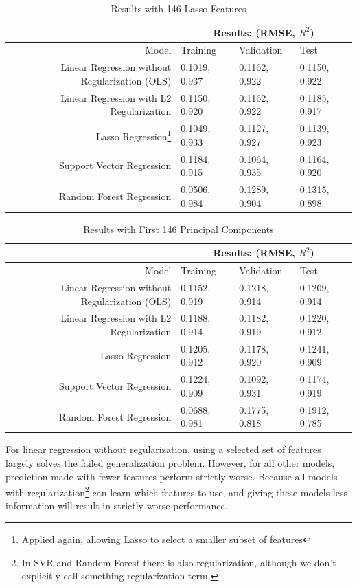\documentclass[a4paper]{article}
\begin{document}
\begin{table}[H]
\centering
\caption{\large Results with 146 Lasso Features}
\vspace{0.3cm}
\begin{tabular}{| r | p{2cm} | p{2cm} | p{2cm} |}
\hline
 & \multicolumn{3}{|c|}{Results: (RMSE, $R^2$)} \\
\hline
Model & Training & Validation & Test \\
\hline
Linear Regression without Regularization (OLS) & 0.1019, 0.937 & 0.1162, 0.922 & 0.1150, 0.922 \\
\hline
Linear Regression with L2 Regularization & 0.1150, 0.920 & 0.1162, 0.922 & 0.1185, 0.917 \\
\hline
Lasso Regression\footnote{Applied again, allowing Lasso to select a smaller subset of features} & 0.1049, 0.933 & 0.1127, 0.927 & 0.1139, 0.923 \\
\hline
Support Vector Regression & 0.1184, 0.915 & 0.1064, 0.935 & 0.1164, 0.920 \\
\hline
Random Forest Regression & 0.0506, 0.984 & 0.1289, 0.904 & 0.1315, 0.898 \\
\hline
\end{tabular}
\end{table}

\begin{table}[H]
\centering
\caption{\large Results with First 146 Principal Components}
\vspace{0.3cm}
\begin{tabular}{| r | p{2cm} | p{2cm} | p{2cm} |}
\hline
 & \multicolumn{3}{|c|}{Results: (RMSE, $R^2$)} \\
\hline
Model & Training & Validation & Test \\
\hline
Linear Regression without Regularization (OLS) & 0.1152, 0.919 & 0.1218, 0.914 & 0.1209, 0.914 \\
\hline
Linear Regression with L2 Regularization & 0.1188, 0.914 & 0.1182, 0.919 & 0.1220, 0.912 \\
\hline
Lasso Regression & 0.1205, 0.912 & 0.1178, 0.920 & 0.1241, 0.909 \\
\hline
Support Vector Regression & 0.1224, 0.909 & 0.1092, 0.931 & 0.1174, 0.919 \\
\hline
Random Forest Regression & 0.0688, 0.981 & 0.1775, 0.818 & 0.1912, 0.785 \\
\hline
\end{tabular}
\end{table}

For linear regression without regularization, using a selected set of features largely solves the failed generalization problem. However, for all other models, prediction made with fewer features perform strictly worse. Because all models with regularization\footnote{In SVR and Random Forest there is also regularization, although we don't explicitly call something regularization term.} can learn which features to use, and giving these models less information will result in strictly worse performance.
\end{document}
